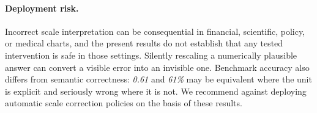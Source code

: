 \paragraph{Deployment risk.}
Incorrect scale interpretation can be consequential in financial, scientific, policy, or medical charts, and the present results do not establish that any tested intervention is safe in those settings. Silently rescaling a numerically plausible answer can convert a visible error into an invisible one. Benchmark accuracy also differs from semantic correctness: \textit{0.61} and \textit{61\%} may be equivalent where the unit is explicit and seriously wrong where it is not. We recommend against deploying automatic scale correction policies on the basis of these results.
